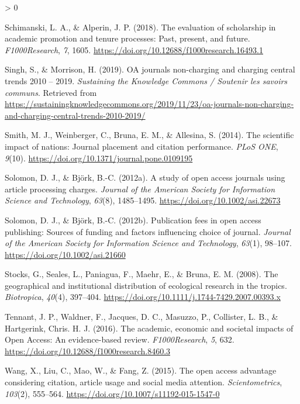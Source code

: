 \documentclass[
  english,
  man]{apa6}
\newlength{\cslhangindent}
\newenvironment{CSLReferences}[2] %
 {%
  \setlength{\parindent}{0pt}
  \ifodd #1 \everypar{\setlength{\hangindent}{\cslhangindent}}\ignorespaces\fi
  \ifnum #2 > 0
  \setlength{\parskip}{#2\baselineskip}
  \fi
 }%
 {}
\begin{document}
\begin{CSLReferences}{1}{0}
\leavevmode\hypertarget{ref-schimanski_evaluation_2018}{}%
Schimanski, L. A., \& Alperin, J. P. (2018). The evaluation of scholarship in academic promotion and tenure processes: {Past}, present, and future. \emph{F1000Research}, \emph{7}, 1605. \url{https://doi.org/10.12688/f1000research.16493.1}

\leavevmode\hypertarget{ref-singh_oa_2019}{}%
Singh, S., \& Morrison, H. (2019). {OA} journals non-charging and charging central trends 2010 -- 2019. \emph{Sustaining the Knowledge Commons / Soutenir les savoirs communs}. Retrieved from \url{https://sustainingknowledgecommons.org/2019/11/23/oa-journals-non-charging-and-charging-central-trends-2010-2019/}

\leavevmode\hypertarget{ref-smith_scientific_2014}{}%
Smith, M. J., Weinberger, C., Bruna, E. M., \& Allesina, S. (2014). The scientific impact of nations: Journal placement and citation performance. \emph{PLoS ONE}, \emph{9}(10). \url{https://doi.org/10.1371/journal.pone.0109195}

\leavevmode\hypertarget{ref-solomon_study_2012}{}%
Solomon, D. J., \& Björk, B.-C. (2012a). A study of open access journals using article processing charges. \emph{Journal of the American Society for Information Science and Technology}, \emph{63}(8), 1485--1495. \url{https://doi.org/10.1002/asi.22673}

\leavevmode\hypertarget{ref-solomon_publication_2012}{}%
Solomon, D. J., \& Björk, B.-C. (2012b). Publication fees in open access publishing: {Sources} of funding and factors influencing choice of journal. \emph{Journal of the American Society for Information Science and Technology}, \emph{63}(1), 98--107. \url{https://doi.org/10.1002/asi.21660}

\leavevmode\hypertarget{ref-stocks_geographical_2008}{}%
Stocks, G., Seales, L., Paniagua, F., Maehr, E., \& Bruna, E. M. (2008). The geographical and institutional distribution of ecological research in the tropics. \emph{Biotropica}, \emph{40}(4), 397--404. \url{https://doi.org/10.1111/j.1744-7429.2007.00393.x}

\leavevmode\hypertarget{ref-tennant_academic_2016}{}%
Tennant, J. P., Waldner, F., Jacques, D. C., Masuzzo, P., Collister, L. B., \& Hartgerink, Chris. H. J. (2016). The academic, economic and societal impacts of {Open} {Access}: An evidence-based review. \emph{F1000Research}, \emph{5}, 632. \url{https://doi.org/10.12688/f1000research.8460.3}

\leavevmode\hypertarget{ref-wang_open_2015}{}%
Wang, X., Liu, C., Mao, W., \& Fang, Z. (2015). The open access advantage considering citation, article usage and social media attention. \emph{Scientometrics}, \emph{103}(2), 555--564. \url{https://doi.org/10.1007/s11192-015-1547-0}


\end{CSLReferences}
\end{document}
